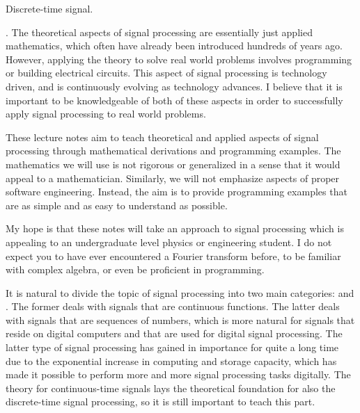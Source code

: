 \begin{marginfigure}%
\begin{center}
\end{center}
\caption{Discrete-time signal.}
\label{fig:dtfig_intro}
\end{marginfigure}

. The theoretical
aspects of signal processing are essentially just applied mathematics,
which often have already been introduced hundreds of years
ago. However, applying the theory to solve real world problems
involves programming or building electrical circuits. This aspect
of signal processing is technology driven, and is continuously
evolving as technology advances. I believe that it is important to be
knowledgeable of both of these aspects in order to successfully apply
signal processing to real world problems.

These lecture notes aim to teach theoretical and applied aspects of signal
processing through mathematical derivations and programming
examples. The mathematics we will use is not rigorous or generalized
in a sense that it would appeal to a mathematician. Similarly, we will
not emphasize aspects of proper software engineering. Instead, the aim
is to provide programming examples that are as simple and as easy to
understand as possible.

My hope is that these notes will take an approach to signal processing
which is appealing to an undergraduate level physics or engineering
student. I do not expect you to have ever encountered a Fourier
transform before, to be familiar with complex algebra, or even be
proficient in programming.

It is natural to divide the topic of signal processing into two main
categories: \emph{}
and \emph{}. The former deals with
signals that are continuous functions. The latter deals with signals
that are sequences of numbers, which is more natural for signals that
reside on digital computers and that are used for digital signal
processing. The latter type of signal processing has gained in
importance for quite a long time due to the exponential increase in
computing and storage capacity, which has made it possible to perform
more and more signal processing tasks digitally. The theory for
continuous-time signals lays the theoretical foundation for also the
discrete-time signal processing, so it is still important to teach
this part.

